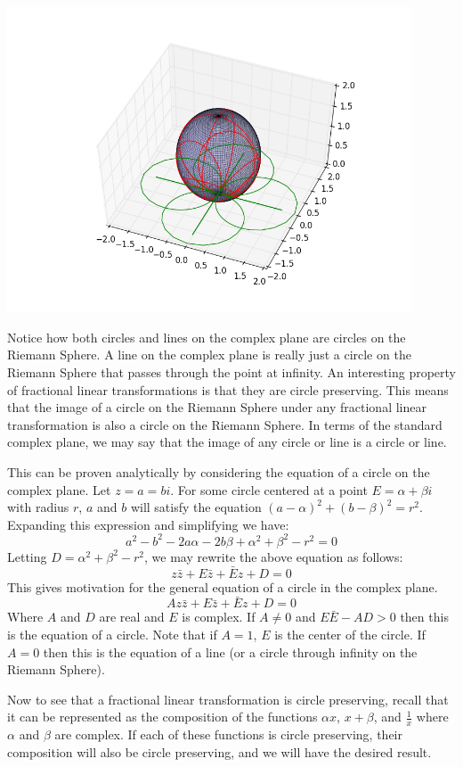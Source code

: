 \includegraphics[width=120mm]{mobius3.png}

Notice how both circles and lines on the complex plane are circles on the Riemann Sphere. A line on the complex plane is really just a circle on the Riemann Sphere that passes through the point at infinity. An interesting property of fractional linear transformations is that they are circle preserving. This means that the image of a circle on the Riemann Sphere under any fractional linear transformation is also a circle on the Riemann Sphere. In terms of the standard complex plane, we may say that the image of any circle or line is a circle or line.

This can be proven analytically by considering the equation of a circle on the complex plane. Let $z=a=bi$. For some circle centered at a point $E=\alpha + \beta i$ with radius $r$, $a$ and $b$ will satisfy the equation $(a-\alpha)^2+(b-\beta)^2=r^2$. Expanding this expression and simplifying we have:
$$a^2-b^2-2a\alpha-2b\beta+\alpha^2+\beta^2-r^2=0$$
Letting $D=\alpha^2+\beta^2-r^2$, we may rewrite the above equation as follows:
$$z\bar{z}+E\bar{z}+\bar{E}z+D=0$$
This gives motivation for the general equation of a circle in the complex plane.
$$Az\bar{z}+E\bar{z}+\bar{E}z+D=0$$
Where $A$ and $D$ are real and $E$ is complex. If $A\neq 0$ and $E\bar{E}-AD>0$ then this is the equation of a circle. Note that if $A=1$, $E$ is the center of the circle. If $A=0$ then this is the equation of a line (or a circle through infinity on the Riemann Sphere).

Now to see that a fractional linear transformation is circle preserving, recall that it can be represented as the composition of the functions $\alpha x$, $x+\beta$, and $\frac{1}{x}$ where $\alpha$ and $\beta$ are complex. If each of these functions is circle preserving, their composition will also be circle preserving, and we will have the desired result. 

